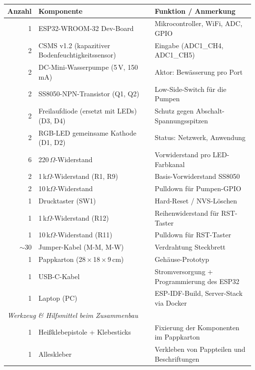 \documentclass[a4paper,12pt]{article}
\begin{document}
\renewcommand{\arraystretch}{1.15}
\begin{center}
\begin{tabularx}{\textwidth}{rXX}
\hline
\textbf{Anzahl} & \textbf{Komponente} & \textbf{Funktion / Anmerkung} \\
\hline
1 & ESP32-WROOM-32 Dev-Board                       & Mikrocontroller, WiFi, ADC, GPIO \\
2 & CSMS v1.2 (kapazitiver Bodenfeuchtigkeitssensor) & Eingabe (ADC1\_CH4, ADC1\_CH5) \\
2 & DC-Mini-Wasserpumpe (5\,V, 150\,mA)            & Aktor: Bewässerung pro Port \\
2 & SS8050-NPN-Transistor (Q1, Q2)                 & Low-Side-Switch für die Pumpen \\
  2 & Freilaufdiode (ersetzt mit LEDs) (D3, D4)    & Schutz gegen Abschalt-Spannungsspitzen \\
2 & RGB-LED gemeinsame Kathode (D1, D2)            & Status: Netzwerk, Anwendung \\
6 & 220\,$\Omega$-Widerstand                       & Vorwiderstand pro LED-Farbkanal \\
2 & 1\,k$\Omega$-Widerstand (R1, R9)               & Basis-Vorwiderstand SS8050 \\
2 & 10\,k$\Omega$-Widerstand                       & Pulldown für Pumpen-GPIO \\
1 & Drucktaster (SW1)                              & Hard-Reset / NVS-Löschen \\
1 & 1\,k$\Omega$-Widerstand (R12)                  & Reihenwiderstand für RST-Taster \\
1 & 10\,k$\Omega$-Widerstand (R11)                 & Pulldown für RST-Taster \\
$\sim$30 & Jumper-Kabel (M-M, M-W)                 & Verdrahtung Steckbrett \\
1 & Pappkarton (28\,$\times$\,18\,$\times$\,9\,cm) & Gehäuse-Prototyp \\
1 & USB-C-Kabel                                    & Stromversorgung + Programmierung des ESP32 \\
1 & Laptop (PC)                                    & ESP-IDF-Build, Server-Stack via Docker \\
\hline
\multicolumn{3}{l}{\textit{Werkzeug \& Hilfsmittel beim Zusammenbau}} \\
\hline
1 & Heißklebepistole + Klebesticks                 & Fixierung der Komponenten im Pappkarton \\
1 & Alleskleber                                    & Verkleben von Pappteilen und Beschriftungen \\

\end{tabularx}
\end{center}
\end{document}
